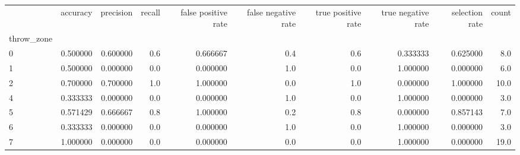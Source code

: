 \begin{tabular}{lrrrrrrrrr}
\toprule
{} &  accuracy &  precision &  recall &  false positive rate &  false negative rate &  true positive rate &  true negative rate &  selection rate &  count \\
throw\_zone &           &            &         &                      &                      &                     &                     &                 &        \\
\midrule
0          &  0.500000 &   0.600000 &     0.6 &             0.666667 &                  0.4 &                 0.6 &            0.333333 &        0.625000 &    8.0 \\
1          &  0.500000 &   0.000000 &     0.0 &             0.000000 &                  1.0 &                 0.0 &            1.000000 &        0.000000 &    6.0 \\
2          &  0.700000 &   0.700000 &     1.0 &             1.000000 &                  0.0 &                 1.0 &            0.000000 &        1.000000 &   10.0 \\
4          &  0.333333 &   0.000000 &     0.0 &             0.000000 &                  1.0 &                 0.0 &            1.000000 &        0.000000 &    3.0 \\
5          &  0.571429 &   0.666667 &     0.8 &             1.000000 &                  0.2 &                 0.8 &            0.000000 &        0.857143 &    7.0 \\
6          &  0.333333 &   0.000000 &     0.0 &             0.000000 &                  1.0 &                 0.0 &            1.000000 &        0.000000 &    3.0 \\
7          &  1.000000 &   0.000000 &     0.0 &             0.000000 &                  0.0 &                 0.0 &            1.000000 &        0.000000 &   19.0 \\
\bottomrule
\end{tabular}
